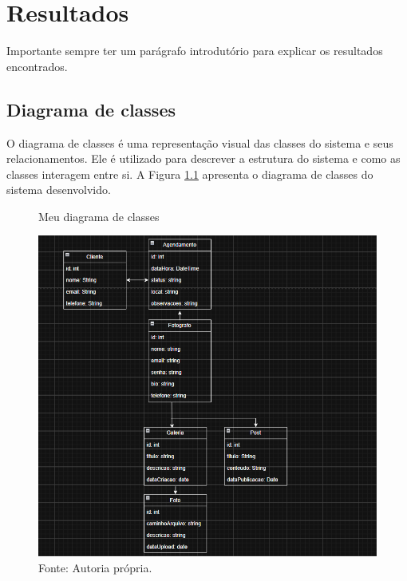 \chapter{Resultados}
\label{chap:result}
Importante sempre ter um parágrafo introdutório para explicar os resultados encontrados.




\section{Diagrama de classes}
\label{sec:class}
O diagrama de classes é uma representação visual das classes do sistema e seus relacionamentos. Ele é utilizado para descrever a estrutura do sistema e como as classes interagem entre si. A Figura \ref{fig:diagrama_classes} apresenta o diagrama de classes do sistema desenvolvido.
\begin{figure} [h!]	
    \centering
    \caption{Meu diagrama de classes}
    \includegraphics[width=1.1\textwidth]{Figures/Diagrama_de_Classes.png}
    \caption*{Fonte: Autoria própria.}
    \label{fig:diagrama_classes}
\end{figure}

